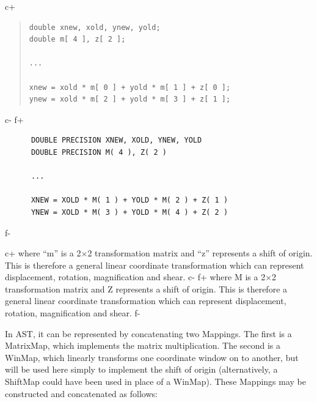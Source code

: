 \documentclass[twoside,11pt]{article}
\begin{document}
c+
\begin{quote}
\small
\begin{verbatim}
double xnew, xold, ynew, yold;
double m[ 4 ], z[ 2 ];

...

xnew = xold * m[ 0 ] + yold * m[ 1 ] + z[ 0 ];
ynew = xold * m[ 2 ] + yold * m[ 3 ] + z[ 1 ];
\end{verbatim}
\normalsize
\end{quote}
c-
f+
\small
\begin{verbatim}
      DOUBLE PRECISION XNEW, XOLD, YNEW, YOLD
      DOUBLE PRECISION M( 4 ), Z( 2 )

      ...

      XNEW = XOLD * M( 1 ) + YOLD * M( 2 ) + Z( 1 )
      YNEW = XOLD * M( 3 ) + YOLD * M( 4 ) + Z( 2 )
\end{verbatim}
\normalsize
f-

c+
where ``m'' is a 2$\times$2 transformation matrix and ``z'' represents
a shift of origin. This is therefore a general linear coordinate
transformation which can represent displacement, rotation,
magnification and shear.
c-
f+
where M is a 2$\times$2 transformation matrix and Z represents a shift
of origin. This is therefore a general linear coordinate
transformation which can represent displacement, rotation,
magnification and shear.
f-

In AST, it can be represented by concatenating two Mappings. The first
is a MatrixMap, which implements the matrix multiplication. The second
is a WinMap, which linearly transforms one coordinate window on to
another, but will be used here simply to implement the shift of
origin (alternatively, a ShiftMap could have been used in place of a
WinMap). These Mappings may be constructed and concatenated as follows:
\end{document}
